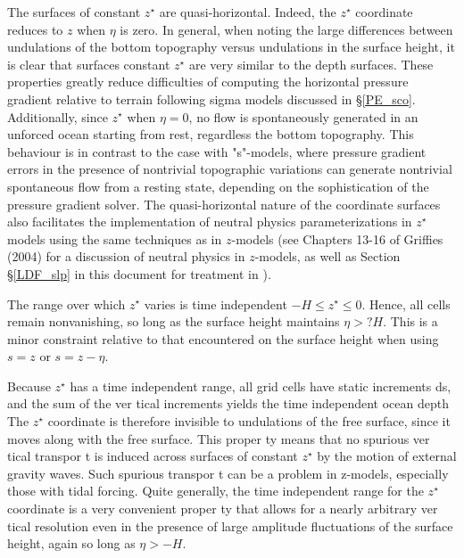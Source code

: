 The surfaces of constant $z^\star$ are quasi-horizontal. Indeed, the $z^\star$ coordinate reduces to $z$ when $\eta$ is zero. In general, when noting the large differences between 
undulations of the bottom topography versus undulations in the surface height, it 
is clear that surfaces constant $z^\star$ are very similar to the depth surfaces. These properties greatly reduce difficulties of computing the horizontal pressure gradient relative to terrain following sigma models discussed in \S\ref{PE_sco}. 
Additionally, since $z^\star$ when $\eta = 0$, no flow is spontaneously generated in an 
unforced ocean starting from rest, regardless the bottom topography. This behaviour is in contrast to the case with "s"-models, where pressure gradient errors in 
the presence of nontrivial topographic variations can generate nontrivial spontaneous flow from a resting state, depending on the sophistication of the pressure 
gradient solver. The quasi-horizontal nature of the coordinate surfaces also facilitates the implementation of neutral physics parameterizations in $z^\star$ models using 
the same techniques as in $z$-models (see Chapters 13-16 of Griffies (2004) for a 
discussion of neutral physics in $z$-models, as well as Section \S\ref{LDF_slp} 
in this document for treatment in \NEMO). 

The range over which $z^\star$ varies is time independent $-H \leq z^\star \leq 0$. Hence, all 
cells remain nonvanishing, so long as the surface height maintains $\eta > ?H$. This 
is a minor constraint relative to that encountered on the surface height when using 
$s = z$ or $s = z - \eta$. 

Because $z^\star$ has a time independent range, all grid cells have static increments 
ds, and the sum of the ver tical increments yields the time independent ocean 
depth %
The $z^\star$ coordinate is therefore invisible to undulations of the 
free surface, since it moves along with the free surface. This proper ty means that 
no spurious ver tical transpor t is induced across surfaces of constant $z^\star$ by the 
motion of external gravity waves. Such spurious transpor t can be a problem in 
z-models, especially those with tidal forcing. Quite generally, the time independent 
range for the $z^\star$ coordinate is a very convenient proper ty that allows for a nearly 
arbitrary ver tical resolution even in the presence of large amplitude fluctuations of 
the surface height, again so long as $\eta > -H$. 





